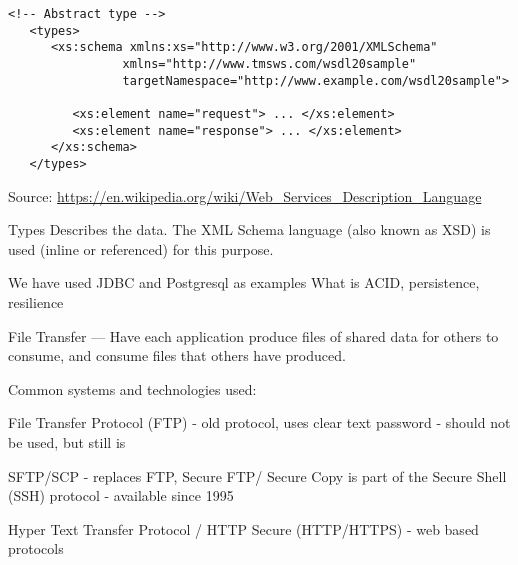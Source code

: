 \documentclass[Screen16to9,17pt]{foils}
\begin{document}

\begin{verbatim}
<!-- Abstract type -->
   <types>
      <xs:schema xmlns:xs="http://www.w3.org/2001/XMLSchema"
                xmlns="http://www.tmsws.com/wsdl20sample"
                targetNamespace="http://www.example.com/wsdl20sample">

         <xs:element name="request"> ... </xs:element>
         <xs:element name="response"> ... </xs:element>
      </xs:schema>
   </types>

\end{verbatim}
Source: \url{https://en.wikipedia.org/wiki/Web_Services_Description_Language}

Types	Describes the data. The XML Schema language (also known as XSD) is used (inline or referenced) for this purpose.





We have used JDBC and Postgresql as examples
What is ACID, persistence, resilience




File Transfer — Have each application produce files of shared data for others to consume, and consume files that others have produced.

Common systems and technologies used:
\begin{list2}
\item File Transfer Protocol (FTP) - old protocol, uses clear text password - should not be used, but still is
\item SFTP/SCP - replaces FTP, Secure FTP/ Secure Copy is part of the Secure Shell (SSH) protocol - available since 1995
\item Hyper Text Transfer Protocol / HTTP Secure (HTTP/HTTPS) - web based protocols
\end{list2}




\end{document}
